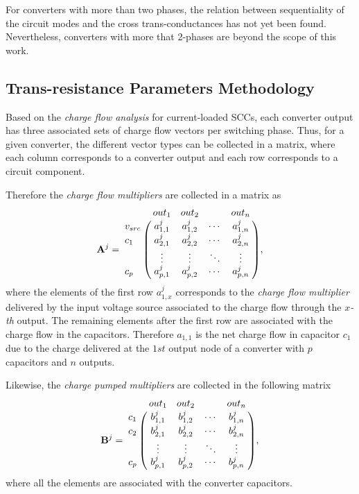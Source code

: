For converters with more than two phases, the relation between sequentiality of the circuit modes and the cross trans-conductances has not yet been found. Nevertheless, converters with more that 2-phases are beyond the scope of this work.

\subsection{Trans-resistance Parameters Methodology}

Based on the \emph{charge flow analysis} for current-loaded SCCs, each converter output has three associated sets of charge flow vectors per switching phase. Thus, for a given converter, the different vector types can be collected in a matrix, where each column corresponds to a converter output and each row corresponds to a circuit component.

Therefore the \emph{charge flow multipliers} are collected in a matrix as
\begin{equation}
 \mathbf{A}^j =
   \bordermatrix { ~ & out_1 & out_2 & ~ & out_n \cr
     v_{src} & a_{1,1}^j  & a_{1,2}^j & \cdots & a_{1,n}^j \cr
     c_1    & a_{2,1}^j  & a_{2,2}^j & \cdots & a_{2,n}^j \cr
      ~     & \vdots     & \vdots & \ddots & \vdots \cr
     c_p    & a_{p,1}^j  & a_{p,2}^j & \cdots & a_{p,n}^j \cr},
 \label{eq:A_matrix}
\end{equation}
where the elements of the first row  $a_{1,x}^j$ corresponds to the \emph{charge flow multiplier}  delivered by the input voltage source associated to the charge flow through the $x$\emph{-th} output. The remaining elements after the first row are associated with the charge flow in the capacitors. Therefore $a_{1,1}$ is the net charge flow in capacitor $c_1$ due to the charge delivered at the $1st$ output node of a converter with $p$ capacitors and $n$ outputs.

Likewise, the \emph{charge pumped multipliers} are collected in the following matrix
\begin{equation}
 \mathbf{B}^j =
   \bordermatrix { ~ & out_1 & out_2 & ~ & out_n \cr
     c_1  & b_{1,1}^j  & b_{1,2}^j & \cdots & b_{1,n}^j \cr
     c_2  & b_{2,1}^j  & b_{2,2}^j & \cdots & b_{2,n}^j \cr
      ~   & \vdots     & \vdots & \ddots & \vdots \cr
     c_p  & b_{p,1}^j  & b_{p,2}^j & \cdots & b_{p,n}^j \cr}
     \label{eq:A_matrix},
\end{equation}
where all the elements are associated with the converter capacitors.

